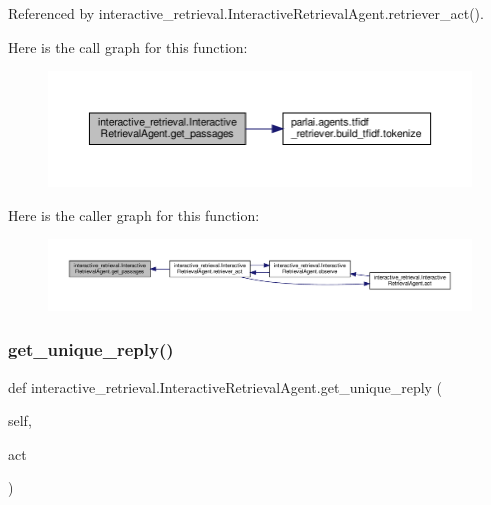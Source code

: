 Referenced by interactive\+\_\+retrieval.\+Interactive\+Retrieval\+Agent.\+retriever\+\_\+act().

Here is the call graph for this function\+:
\nopagebreak
\begin{figure}[H]
\begin{center}
\leavevmode
\includegraphics[width=350pt]{classinteractive__retrieval_1_1InteractiveRetrievalAgent_acee2bc62b6109f28c06b82efb816eee3_cgraph}
\end{center}
\end{figure}
Here is the caller graph for this function\+:
\nopagebreak
\begin{figure}[H]
\begin{center}
\leavevmode
\includegraphics[width=350pt]{classinteractive__retrieval_1_1InteractiveRetrievalAgent_acee2bc62b6109f28c06b82efb816eee3_icgraph}
\end{center}
\end{figure}
\mbox{\label{classinteractive__retrieval_1_1InteractiveRetrievalAgent_a83b0e3a253116e5ce23a4a9388cbc672}} 
\subsubsection{\texorpdfstring{get\+\_\+unique\+\_\+reply()}{get\_unique\_reply()}}
{\footnotesize\ttfamily def interactive\+\_\+retrieval.\+Interactive\+Retrieval\+Agent.\+get\+\_\+unique\+\_\+reply (\begin{DoxyParamCaption}\item[{}]{self,  }\item[{}]{act }\end{DoxyParamCaption})}




